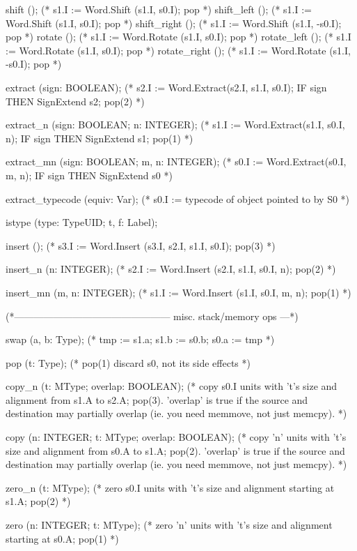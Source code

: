 {shift        ();  (* s1.I := Word.Shift  (s1.I, s0.I); pop *)
shift_left   ();  (* s1.I := Word.Shift  (s1.I, s0.I); pop *)
shift_right  ();  (* s1.I := Word.Shift  (s1.I, -s0.I); pop *)
rotate       ();  (* s1.I := Word.Rotate (s1.I, s0.I); pop *)
rotate_left  ();  (* s1.I := Word.Rotate (s1.I, s0.I); pop *)
rotate_right ();  (* s1.I := Word.Rotate (s1.I, -s0.I); pop *)

extract (sign: BOOLEAN);
(* s2.I := Word.Extract(s2.I, s1.I, s0.I);
   IF sign THEN SignExtend s2; pop(2) *)

extract_n (sign: BOOLEAN;  n: INTEGER);
(* s1.I := Word.Extract(s1.I, s0.I, n);
   IF sign THEN SignExtend s1; pop(1) *)

extract_mn (sign: BOOLEAN;  m, n: INTEGER);
(* s0.I := Word.Extract(s0.I, m, n);
   IF sign THEN SignExtend s0 *)

extract_typecode (equiv: Var);
(* s0.I := typecode of object pointed to by S0 *)

istype (type: TypeUID; t, f: Label);

insert ();
(* s3.I := Word.Insert (s3.I, s2.I, s1.I, s0.I); pop(3) *)

insert_n (n: INTEGER);
(* s2.I := Word.Insert (s2.I, s1.I, s0.I, n); pop(2) *)

insert_mn (m, n: INTEGER);
(* s1.I := Word.Insert (s1.I, s0.I, m, n); pop(1) *)

(*------------------------------------------------ misc. stack/memory ops ---*)

swap (a, b: Type);
(* tmp := s1.a; s1.b := s0.b; s0.a := tmp *)

pop (t: Type);
(* pop(1) discard s0, not its side effects *)

copy_n (t: MType;  overlap: BOOLEAN);
(* copy s0.I units with 't's size and alignment from s1.A to s2.A; pop(3).
   'overlap' is true if the source and destination may partially overlap
   (ie. you need memmove, not just memcpy). *)

copy (n: INTEGER;  t: MType;  overlap: BOOLEAN);
(* copy 'n' units with 't's size and alignment from s0.A to s1.A; pop(2).
   'overlap' is true if the source and destination may partially overlap
   (ie. you need memmove, not just memcpy). *)

zero_n (t: MType);
(* zero s0.I units with 't's size and alignment starting at s1.A; pop(2) *)

zero (n: INTEGER;  t: MType);
(* zero 'n' units with 't's size and alignment starting at s0.A; pop(1) *)

}
